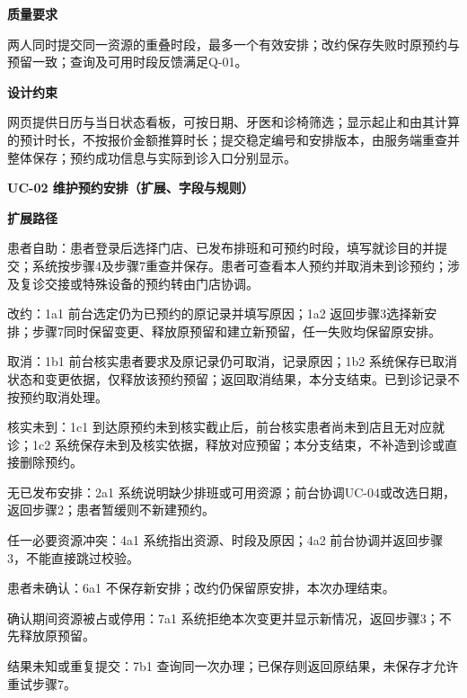 \documentclass[UTF8,a4paper,zihao=-4,fontset=none]{ctexart}
\begin{document}
\noindent\textbf{质量要求}\par\smallskip
两人同时提交同一资源的重叠时段，最多一个有效安排；改约保存失败时原预约与预留一致；查询及可用时段反馈满足Q-01。\par
\noindent\textbf{设计约束}\par\smallskip
网页提供日历与当日状态看板，可按日期、牙医和诊椅筛选；显示起止和由其计算的预计时长，不按报价金额推算时长；提交稳定编号和安排版本，由服务端重查并整体保存；预约成功信息与实际到诊入口分别显示。\par
\clearpage
\begingroup\small\linespread{1.04}\selectfont
\noindent\textbf{UC-02 维护预约安排（扩展、字段与规则）}\par\smallskip
\noindent\textbf{扩展路径}\par\smallskip
\begin{description}\setlength{\itemsep}{2pt}\setlength{\parsep}{0pt}
\item[1d] 患者自助：患者登录后选择门店、已发布排班和可预约时段，填写就诊目的并提交；系统按步骤4及步骤7重查并保存。患者可查看本人预约并取消未到诊预约；涉及复诊交接或特殊设备的预约转由门店协调。
\item[1a] 改约：1a1 前台选定仍为已预约的原记录并填写原因；1a2 返回步骤3选择新安排；步骤7同时保留变更、释放原预留和建立新预留，任一失败均保留原安排。
\item[1b] 取消：1b1 前台核实患者要求及原记录仍可取消，记录原因；1b2 系统保存已取消状态和变更依据，仅释放该预约预留；返回取消结果，本分支结束。已到诊记录不按预约取消处理。
\item[1c] 核实未到：1c1 到达原预约未到核实截止后，前台核实患者尚未到店且无对应就诊；1c2 系统保存未到及核实依据，释放对应预留；本分支结束，不补造到诊或直接删除预约。
\item[2a] 无已发布安排：2a1 系统说明缺少排班或可用资源；前台协调UC-04或改选日期，返回步骤2；患者暂缓则不新建预约。
\item[4a] 任一必要资源冲突：4a1 系统指出资源、时段及原因；4a2 前台协调并返回步骤3，不能直接跳过校验。
\item[6a] 患者未确认：6a1 不保存新安排；改约仍保留原安排，本次办理结束。
\item[7a] 确认期间资源被占或停用：7a1 系统拒绝本次变更并显示新情况，返回步骤3；不先释放原预留。
\item[7b] 结果未知或重复提交：7b1 查询同一次办理；已保存则返回原结果，未保存才允许重试步骤7。
\end{description}
\end{document}
